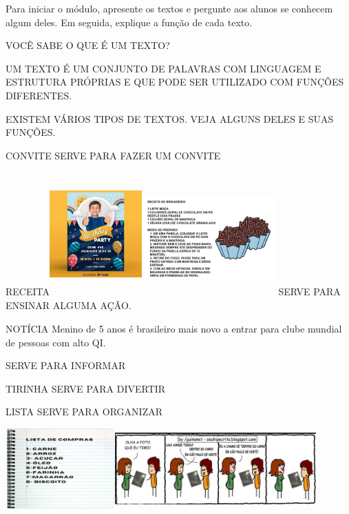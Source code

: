 Para iniciar o módulo, apresente os textos e pergunte aos alunos se
conhecem algum deles. Em seguida, explique a função de cada texto.

VOCÊ SABE O QUE É UM TEXTO?

UM TEXTO É UM CONJUNTO DE PALAVRAS COM LINGUAGEM E ESTRUTURA PRÓPRIAS E QUE PODE SER UTILIZADO COM FUNÇÕES DIFERENTES.

EXISTEM VÁRIOS TIPOS DE TEXTOS. VEJA ALGUNS DELES E SUAS FUNÇÕES.

CONVITE
SERVE PARA FAZER UM CONVITE

RECEITA\includegraphics[width=1.39444in,height=1.86944in]{media/image132.jpg}\includegraphics[width=2.02014in,height=1.72778in]{media/image134.png}
SERVE PARA ENSINAR ALGUMA AÇÃO.

NOTÍCIA
Menino de 5 anos é brasileiro mais novo
a entrar para clube mundial de pessoas com alto QI.

SERVE PARA INFORMAR 

TIRINHA
SERVE PARA DIVERTIR

LISTA
SERVE PARA ORGANIZAR

\includegraphics[width=1.65625in,height=1.20625in]{media/image135.png}\includegraphics[width=3.04583in,height=1.19514in]{media/image136.png}


